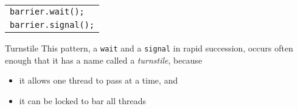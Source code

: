 \begin{frame}%
  \begin{center}
    \begin{tabular}{l}
      \texttt{barrier.wait();}\\
      \texttt{barrier.signal();}
    \end{tabular}
  \end{center}
  \begin{block}{Turnstile}
    This pattern, a \texttt{wait} and a \texttt{signal} in rapid succession, occurs often
    enough that it has a name called a \emph{turnstile}, because
    \begin{itemize}
    \item it allows one thread to pass at a time, and
    \item it can be locked to bar all threads
    \end{itemize}
  \end{block}
\end{frame}


